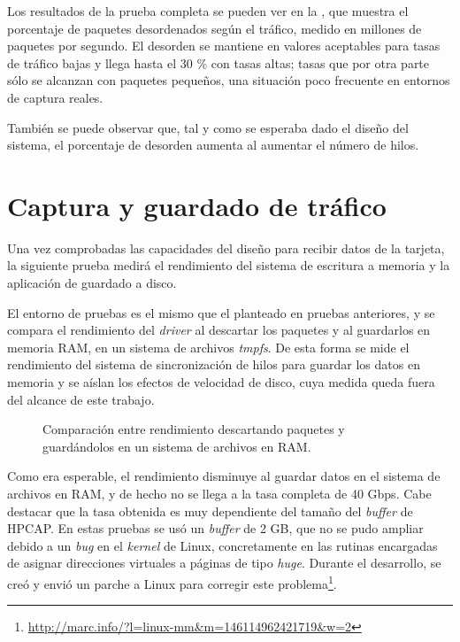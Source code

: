 \documentclass[twoside, 12pt, draft]{epstfg}
\begin{document}
Los resultados de la prueba completa se pueden ver en la , que muestra el porcentaje de paquetes desordenados según el tráfico, medido en millones de paquetes por segundo. El desorden se mantiene en valores aceptables para tasas de tráfico bajas y llega hasta el 30 \% con tasas altas; tasas que por otra parte sólo se alcanzan con paquetes pequeños, una situación poco frecuente en entornos de captura reales.

También se puede observar que, tal y como se esperaba dado el diseño del sistema, el porcentaje de desorden aumenta al aumentar el número de hilos.

\section{Captura y guardado de tráfico}

Una vez comprobadas las capacidades del diseño para recibir datos de la tarjeta, la siguiente prueba medirá el rendimiento del sistema de escritura a memoria y la aplicación de guardado a disco.

El entorno de pruebas es el mismo que el planteado en pruebas anteriores, y se compara el rendimiento del \textit{driver} al descartar los paquetes y al guardarlos en memoria RAM, en un sistema de archivos \textit{tmpfs}. De esta forma se mide el rendimiento del sistema de sincronización de hilos para guardar los datos en memoria y se aíslan los efectos de velocidad de disco, cuya medida queda fuera del alcance de este trabajo.

\begin{figure}[hbtp]
\caption{Comparación entre rendimiento descartando paquetes y guardándolos en un sistema de archivos en RAM.}
\label{fig:Validacion:DiskStore}
\end{figure}

Como era esperable, el rendimiento disminuye al guardar datos en el sistema de archivos en RAM, y de hecho no se llega a la tasa completa de 40 Gbps. Cabe destacar que la tasa obtenida es muy dependiente del tamaño del \textit{buffer} de HPCAP. En estas pruebas se usó un \textit{buffer} de 2 GB, que no se pudo ampliar debido a un \textit{bug} en el \textit{kernel} de Linux, concretamente en las rutinas encargadas de asignar direcciones virtuales a páginas de tipo \textit{huge}. Durante el desarrollo, se creó y envió un parche a Linux para corregir este problema\footnote{\url{http://marc.info/?l=linux-mm&m=146114962421719&w=2}}.
\end{document}

